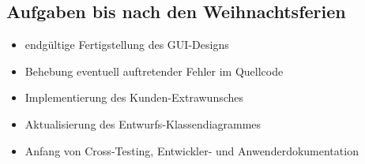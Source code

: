 \documentclass[12pt,a4paper]{article}
\begin{document}
\subsection*{Aufgaben bis nach den Weihnachtsferien}
\medskip
\begin{itemize}
\item endgültige Fertigstellung des GUI-Designs
\item Behebung eventuell auftretender Fehler im Quellcode
\item Implementierung des Kunden-Extrawunsches
\item Aktualisierung des Entwurfs-Klassendiagrammes
\item Anfang von Cross-Testing, Entwickler- und Anwenderdokumentation
\end{itemize}
\end{document}
